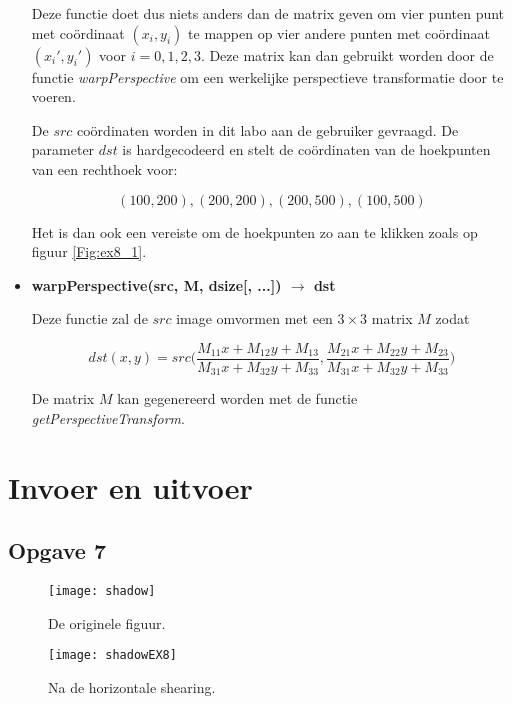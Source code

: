 \documentclass{article}
\begin{document}
\begin{itemize}
		 Deze functie doet dus niets anders dan de matrix geven om vier punten punt met coördinaat $(x_i, y_i)$ te mappen op vier andere punten met coördinaat $(x_i', y_i')$ voor $i = 0, 1, 2, 3$. Deze matrix kan dan gebruikt worden door de functie \textit{warpPerspective} om een werkelijke perspectieve transformatie door te voeren.
		 
		 De $src$ coördinaten worden in dit labo aan de gebruiker gevraagd. De parameter $dst$ is hardgecodeerd en stelt de coördinaten van de hoekpunten van een rechthoek voor: 
		 
		 $$(100, 200), (200, 200), (200, 500), (100, 500)$$
		 
		 Het is dan ook een vereiste om de hoekpunten zo aan te klikken zoals op figuur \ref{Fig:ex8_1}.
		 
		 \item \textbf{warpPerspective(src, M, dsize[, ...]) $\rightarrow$ dst}
		 
		Deze functie zal de $src$ image omvormen met een $3 \times 3$ matrix $M$ zodat
		
		$$dst(x, y) = src\bigg(\frac{M_{11}x + M_{12}y + M_{13}}{M_{31}x + M_{32}y + M_{33}}, \frac{M_{21}x + M_{22}y + M_{23}}{M_{31}x + M_{32}y + M_{33}}\bigg)$$
		 
		 De matrix $M$ kan gegenereerd worden met de functie \textit{getPerspectiveTransform}.
		
		
	\end{itemize}
\newpage
	\section{Invoer en uitvoer}
	
	\subsection*{Opgave 7}
	\begin{figure}[!htb]
		\begin{minipage}{0.4\textwidth}
			\centering
			\texttt{[image: shadow]}
			\caption{De originele figuur.}
			\label{Fig:ex7_1}
		\end{minipage}\hfill
		\begin{minipage}{0.4\textwidth}
			\centering
			\texttt{[image: shadowEX8]}
			\caption{Na de horizontale shearing.}
			\label{Fig:ex7_2}
		\end{minipage}\hfill
	\end{figure}
	
\end{document}
